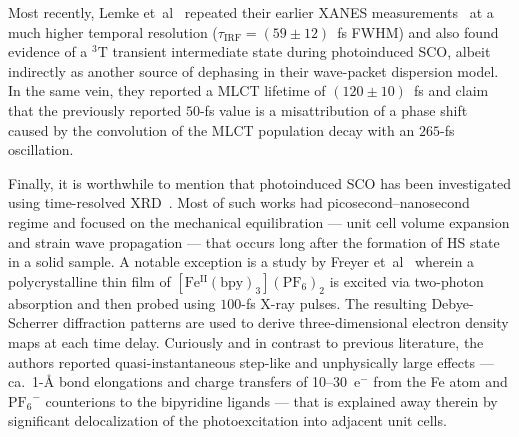 Most recently, Lemke et~al~\cite{Lemke2017} repeated their earlier XANES measurements~\cite{Lemke2013}
at a much higher temporal resolution ($\tau_\text{IRF} = (59 \pm 12)$~fs FWHM)
and also found evidence of a $\mathrm{^3 T}$ transient intermediate state
during photoinduced SCO, albeit indirectly as another source of dephasing
in their wave-packet dispersion model.
In the same vein, they reported a MLCT lifetime of $(120 \pm 10)$~fs and
claim that the previously reported $50$-fs value is a misattribution
of a phase shift caused by the convolution of the MLCT population decay
with an $265$-fs oscillation.

Finally, it is worthwhile to mention that photoinduced SCO has been investigated
using time-resolved XRD~\cite{Lorenc2009, Cailleau2010, Lorenc2012, Collet2012a,
Collet2012b, Kaszub2013, Marino2015, Freyer2013}.
%
Most of such works had picosecond--nanosecond regime and
focused on the mechanical equilibration
--- unit cell volume expansion and strain wave propagation ---
that occurs long after the formation of HS state in a solid sample.
%
A notable exception is a study by Freyer et~al~\cite{Freyer2013}
wherein a polycrystalline thin film of $\mathrm{[Fe^{II}(bpy)_3](PF_6)_2}$
is excited via two-photon absorption and then probed using $100$-fs X-ray pulses.
The resulting Debye-Scherrer diffraction patterns are used to derive
three-dimensional electron density maps at each time delay.
%
Curiously and in contrast to previous literature,
the authors reported quasi-instantaneous step-like
and unphysically large effects ---
ca.~1-\AA{} bond elongations and charge transfers of 10--30~e$^-$
from the Fe atom and $\mathrm{PF_6}^{-}$ counterions to the bipyridine ligands ---
that is explained away therein by significant delocalization
of the photoexcitation into adjacent unit cells.




